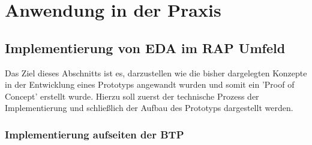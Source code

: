 \section{Anwendung in der Praxis}

\subsection{Implementierung von EDA im RAP Umfeld}
  Das Ziel dieses Abschnitts ist es, darzustellen wie die bisher dargelegten Konzepte in der Entwicklung eines Prototyps angewandt wurden und somit ein 'Proof of Concept' erstellt wurde. Hierzu soll zuerst der technische Prozess der Implementierung und schließlich der Aufbau des Prototyps dargestellt werden.\\

  \subsubsection*{Implementierung aufseiten der BTP}
    
